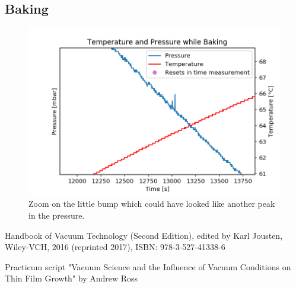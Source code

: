 \documentclass[]{article}
\begin{document}
\subsection{Baking}
\begin{figure}[!h]
\centering\includegraphics[width=.5\textwidth]{Plots/FluktuationBaking.png}
\caption{Zoom on the little bump which could have looked like another peak in the pressure.}
\label{fig::bump}
\end{figure}


\newpage
\begin{thebibliography}{9}

 Handbook of Vacuum Technology (Second Edition), edited by Karl Jousten, Wiley-VCH, 2016 (reprinted 2017), ISBN: 978-3-527-41338-6

Practicum script "Vacuum Science and the Inﬂuence of Vacuum Conditions on Thin Film Growth" by Andrew Ross 

\end{thebibliography}
\end{document}
